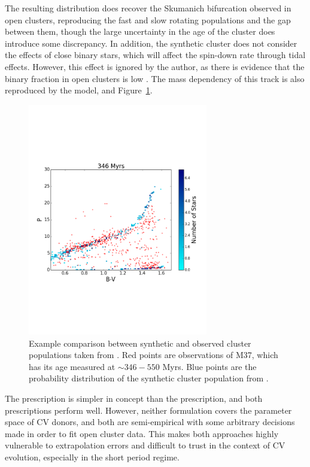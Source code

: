 The resulting distribution does recover the Skumanich bifurcation observed in open clusters, reproducing the fast and slow rotating populations and the gap between them, though the large uncertainty in the age of the cluster does introduce some discrepancy. 
In addition, the synthetic cluster does not consider the effects of close binary stars, which will affect the spin-down rate through tidal effects. However, this effect is ignored by the author, as there is evidence that the binary fraction in open clusters is low \citep{meibom2007}.
The mass dependency of this track is also reproduced by the model, and Figure~\ref{fig:introduction:garraffo 2018a fig 4}.
\begin{figure}
    \centering
    \includegraphics[width=0.7\textwidth, trim={0 5cm 0 5cm}]{figures/introduction/garraffo2018_M37_346_hPer.pdf}
    \caption{Example comparison between synthetic and observed cluster populations taken from \citet{garraffo2018a}. Red points are observations of M37, which has its age measured at $\sim 346 - 550$ Myrs. Blue points are the probability distribution of the synthetic cluster population from \citet{garraffo2018a}.}
    \label{fig:introduction:garraffo 2018a fig 4}
\end{figure}

The \citet{garraffo2018a} prescription is simpler in concept than the \citet{matt2015} prescription, and both prescriptions perform well. However, neither formulation covers the parameter space of CV donors, and both are semi-empirical with some arbitrary decisions made in order to fit open cluster data. This makes both approaches highly vulnerable to extrapolation errors and difficult to trust in the context of CV evolution, especially in the short period regime.


